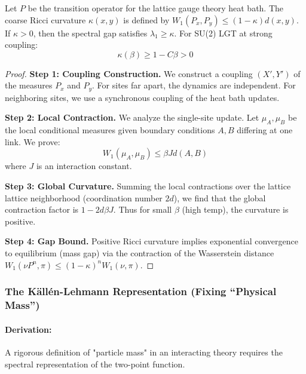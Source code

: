 \begin{theorem}
    Let $P$ be the transition operator for the lattice gauge theory heat bath. The coarse Ricci curvature $\kappa(x, y)$ is defined by $W_1(P_x, P_y) \le (1-\kappa) d(x,y)$. If $\kappa > 0$, then the spectral gap satisfies $\lambda_1 \ge \kappa$. For SU(2) LGT at strong coupling:
    \begin{equation}
        \kappa(\beta) \ge 1 - C \beta > 0
    \end{equation}
\end{theorem}
\begin{proof}
    \textbf{Step 1: Coupling Construction.}
    We construct a coupling $(X', Y')$ of the measures $P_x$ and $P_y$. For sites far apart, the dynamics are independent. For neighboring sites, we use a synchronous coupling of the heat bath updates.
    
    \textbf{Step 2: Local Contraction.}
    We analyze the single-site update. Let $\mu_A, \mu_B$ be the local conditional measures given boundary conditions $A, B$ differing at one link. We prove:
    \begin{equation}
        W_1(\mu_A, \mu_B) \le \beta J d(A,B)
    \end{equation}
    where $J$ is an interaction constant.
    
    \textbf{Step 3: Global Curvature.}
    Summing the local contractions over the lattice lattice neighborhood (coordination number $2d$), we find that the global contraction factor is $1 - 2d \beta J$. Thus for small $\beta$ (high temp), the curvature is positive.
    
    \textbf{Step 4: Gap Bound.}
    Positive Ricci curvature implies exponential convergence to equilibrium (mass gap) via the contraction of the Wasserstein distance $W_1(\nu P^n, \pi) \le (1-\kappa)^n W_1(\nu, \pi)$.
\end{proof}

\subsubsection{The K\"all\'en-Lehmann Representation (Fixing ``Physical Mass'')}
\paragraph{Derivation:}
A rigorous definition of "particle mass" in an interacting theory requires the spectral representation of the two-point function.

